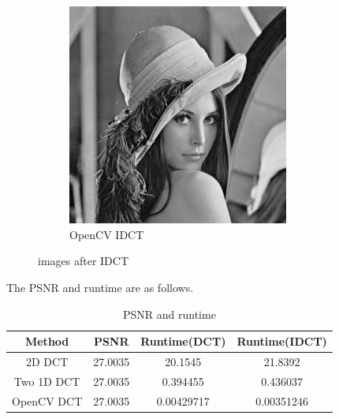 \documentclass{homework}
\begin{document}
\begin{figure}[H]
\begin{subfigure}{0.32\textwidth}
        \centering
        \includegraphics[width=0.8\textwidth]{idct_opencv.png}
        \caption{OpenCV IDCT}
    \end{subfigure}
    \caption{images after IDCT}
\end{figure}

The PSNR and runtime are as follows.


\begin{table}[H]
    \centering
    \begin{tabular}{|c|c|c|c|}
        \hline
        Method & PSNR & Runtime(DCT) & Runtime(IDCT)  \\
        \hline
        2D DCT & \num{27.0035} & \num{20.1545} & \num{21.8392} \\
        Two 1D DCT & \num{27.0035} & \num{0.394455} & \num{0.436037} \\
        OpenCV DCT & \num{27.0035} & \num{0.00429717} & \num{0.00351246} \\
        \hline
    \end{tabular}
    \caption{PSNR and runtime}
\end{table}
\end{document}

